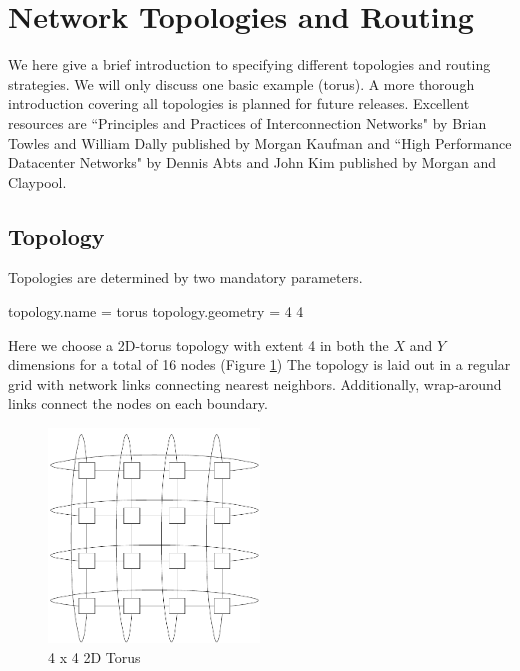 
\section{Network Topologies and Routing}
\label{sec:tutorial:topology}
We here give a brief introduction to specifying different topologies and routing strategies.  
We will only discuss one basic example (torus).  
A more thorough introduction covering all topologies is planned for future releases.
Excellent resources are ``Principles and Practices of Interconnection Networks" by Brian Towles and William Dally published by Morgan Kaufman and ``High Performance Datacenter Networks" by Dennis Abts and John Kim published by Morgan and Claypool.

\subsection{Topology}
\label{subsec:tutorial:topology}

Topologies are determined by two mandatory parameters.
\begin{ViFile}
topology.name = torus
topology.geometry = 4 4
\end{ViFile}
Here we choose a 2D-torus topology with extent 4 in both the $X$ and $Y$ dimensions for a total of 16 nodes (Figure \ref{fig:hdtorus:basic})
The topology is laid out in a regular grid with network links connecting nearest neighbors.  
Additionally, wrap-around links connect the nodes on each boundary.  
\begin{figure}[h]
\centering
\includegraphics[width=0.5\textwidth]{figures/tikz/torus/torus.pdf}
\caption{4 x 4 2D Torus}
\label{fig:hdtorus:basic}
\end{figure}


